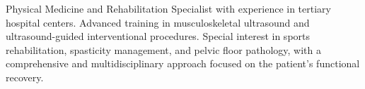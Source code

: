 

\begin{cvparagraph}

Physical Medicine and Rehabilitation Specialist with experience in tertiary hospital centers. Advanced training in musculoskeletal ultrasound and ultrasound-guided interventional procedures. Special interest in sports rehabilitation, spasticity management, and pelvic floor pathology, with a comprehensive and multidisciplinary approach focused on the patient's functional recovery.
\end{cvparagraph}
